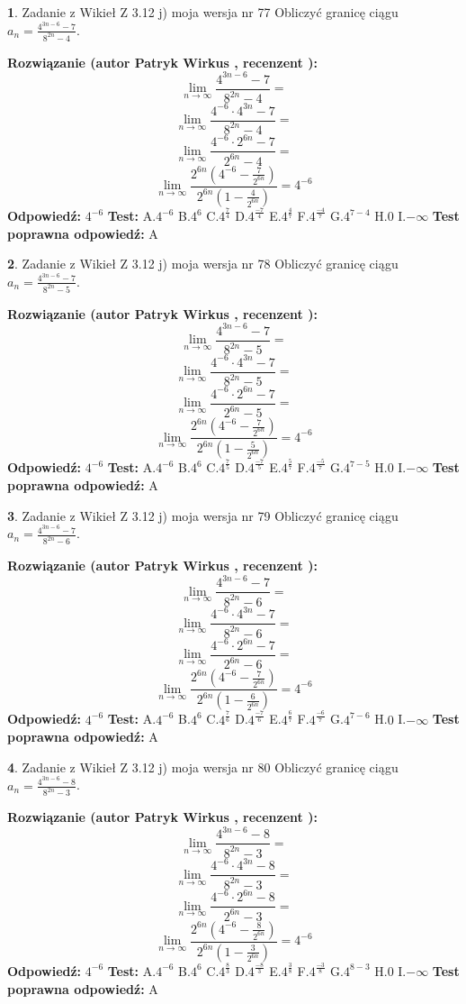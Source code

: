 \documentclass[12pt, a4paper]{article}
\theoremstyle{definition} %
\newtheorem{zad}{}
\newcommand{\zadStart}[1]{\begin{zad}#1\newline}
\newcommand{\zadStop}{\end{zad}}
\newcommand{\rozwStart}[2]{\noindent \textbf{Rozwiązanie (autor #1 , recenzent #2): }\newline}
\newcommand{\rozwStop}{\newline}
\newcommand{\odpStart}{\noindent \textbf{Odpowiedź:}\newline}
\newcommand{\odpStop}{\newline}
\newcommand{\testStart}{\noindent \textbf{Test:}\newline}
\newcommand{\testStop}{\newline}
\newcommand{\kluczStart}{\noindent \textbf{Test poprawna odpowiedź:}\newline}
\newcommand{\kluczStop}{\newline}
\begin{document}
\zadStart{Zadanie z Wikieł Z 3.12 j) moja wersja nr 77}
Obliczyć granicę ciągu $a_{n}=\frac{4^{3n-6}-7}{8^{2n}-4}$.
\zadStop
\rozwStart{Patryk Wirkus}{}
$$\lim\limits_{n\to\infty}\frac{4^{3n-6}-7}{8^{2n}-4}=$$
$$\lim\limits_{n\to\infty}\frac{4^{-6} \cdot 4^{3n}-7}{8^{2n}-4}=$$
$$\lim\limits_{n\to\infty}\frac{4^{-6} \cdot 2^{6n}-7}{2^{6n}-4}=$$
$$\lim\limits_{n\to\infty}\frac{2^{6n}(4^{-6} - \frac{7}{2^{6n}})}{2^{6n}(1-\frac{4}{2^{6n}})}= 4^{-6}$$
\rozwStop
\odpStart
$4^{-6}$
\odpStop
\testStart
A.$4^{-6}$
B.$4^{6}$
C.$4^{\frac{7}{4}}$
D.$4^{\frac{-7}{4}}$
E.$4^{\frac{4}{7}}$
F.$4^{\frac{-4}{7}}$
G.$4^{7-4}$
H.$0$
I.$-\infty$
\testStop
\kluczStart
A
\kluczStop



\zadStart{Zadanie z Wikieł Z 3.12 j) moja wersja nr 78}
Obliczyć granicę ciągu $a_{n}=\frac{4^{3n-6}-7}{8^{2n}-5}$.
\zadStop
\rozwStart{Patryk Wirkus}{}
$$\lim\limits_{n\to\infty}\frac{4^{3n-6}-7}{8^{2n}-5}=$$
$$\lim\limits_{n\to\infty}\frac{4^{-6} \cdot 4^{3n}-7}{8^{2n}-5}=$$
$$\lim\limits_{n\to\infty}\frac{4^{-6} \cdot 2^{6n}-7}{2^{6n}-5}=$$
$$\lim\limits_{n\to\infty}\frac{2^{6n}(4^{-6} - \frac{7}{2^{6n}})}{2^{6n}(1-\frac{5}{2^{6n}})}= 4^{-6}$$
\rozwStop
\odpStart
$4^{-6}$
\odpStop
\testStart
A.$4^{-6}$
B.$4^{6}$
C.$4^{\frac{7}{5}}$
D.$4^{\frac{-7}{5}}$
E.$4^{\frac{5}{7}}$
F.$4^{\frac{-5}{7}}$
G.$4^{7-5}$
H.$0$
I.$-\infty$
\testStop
\kluczStart
A
\kluczStop



\zadStart{Zadanie z Wikieł Z 3.12 j) moja wersja nr 79}
Obliczyć granicę ciągu $a_{n}=\frac{4^{3n-6}-7}{8^{2n}-6}$.
\zadStop
\rozwStart{Patryk Wirkus}{}
$$\lim\limits_{n\to\infty}\frac{4^{3n-6}-7}{8^{2n}-6}=$$
$$\lim\limits_{n\to\infty}\frac{4^{-6} \cdot 4^{3n}-7}{8^{2n}-6}=$$
$$\lim\limits_{n\to\infty}\frac{4^{-6} \cdot 2^{6n}-7}{2^{6n}-6}=$$
$$\lim\limits_{n\to\infty}\frac{2^{6n}(4^{-6} - \frac{7}{2^{6n}})}{2^{6n}(1-\frac{6}{2^{6n}})}= 4^{-6}$$
\rozwStop
\odpStart
$4^{-6}$
\odpStop
\testStart
A.$4^{-6}$
B.$4^{6}$
C.$4^{\frac{7}{6}}$
D.$4^{\frac{-7}{6}}$
E.$4^{\frac{6}{7}}$
F.$4^{\frac{-6}{7}}$
G.$4^{7-6}$
H.$0$
I.$-\infty$
\testStop
\kluczStart
A
\kluczStop



\zadStart{Zadanie z Wikieł Z 3.12 j) moja wersja nr 80}
Obliczyć granicę ciągu $a_{n}=\frac{4^{3n-6}-8}{8^{2n}-3}$.
\zadStop
\rozwStart{Patryk Wirkus}{}
$$\lim\limits_{n\to\infty}\frac{4^{3n-6}-8}{8^{2n}-3}=$$
$$\lim\limits_{n\to\infty}\frac{4^{-6} \cdot 4^{3n}-8}{8^{2n}-3}=$$
$$\lim\limits_{n\to\infty}\frac{4^{-6} \cdot 2^{6n}-8}{2^{6n}-3}=$$
$$\lim\limits_{n\to\infty}\frac{2^{6n}(4^{-6} - \frac{8}{2^{6n}})}{2^{6n}(1-\frac{3}{2^{6n}})}= 4^{-6}$$
\rozwStop
\odpStart
$4^{-6}$
\odpStop
\testStart
A.$4^{-6}$
B.$4^{6}$
C.$4^{\frac{8}{3}}$
D.$4^{\frac{-8}{3}}$
E.$4^{\frac{3}{8}}$
F.$4^{\frac{-3}{8}}$
G.$4^{8-3}$
H.$0$
I.$-\infty$
\testStop
\kluczStart
A
\kluczStop
\end{document}

